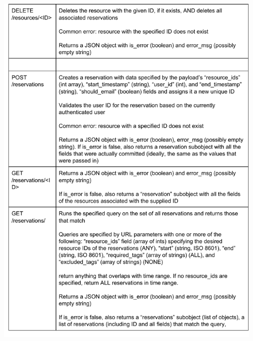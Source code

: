 \documentclass[12pt]{article}
\begin{document}
\includegraphics[width=6in]{apispec_02.pdf}
\end{document}
